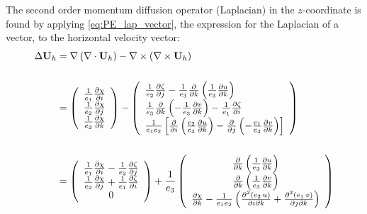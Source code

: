 \documentclass[../main/NEMO_manual]{subfiles}
\begin{document}
The second order momentum diffusion operator (Laplacian) in the $z$-coordinate is found by
applying \autoref{eq:PE_lap_vector}, the expression for the Laplacian of a vector,
to the horizontal velocity vector:
\begin{align*}
  \Delta {\textbf{U}}_h
  &=\nabla \left( {\nabla \cdot {\textbf{U}}_h } \right)-
    \nabla \times \left( {\nabla \times {\textbf{U}}_h } \right) \\ \\
  &=\left( {{
    \begin{array}{*{20}c}
      {\frac{1}{e_1 }\frac{\partial \chi }{\partial i}} \hfill \\
      {\frac{1}{e_2 }\frac{\partial \chi }{\partial j}} \hfill \\
      {\frac{1}{e_3 }\frac{\partial \chi }{\partial k}} \hfill \\
    \end{array}
  }} \right)
  -\left( {{
  \begin{array}{*{20}c}
    {\frac{1}{e_2 }\frac{\partial \zeta }{\partial j}-\frac{1}{e_3
    }\frac{\partial }{\partial k}\left( {\frac{1}{e_3 }\frac{\partial
    u}{\partial k}} \right)} \hfill \\
    {\frac{1}{e_3 }\frac{\partial }{\partial k}\left( {-\frac{1}{e_3
    }\frac{\partial v}{\partial k}} \right)-\frac{1}{e_1 }\frac{\partial \zeta
    }{\partial i}} \hfill \\
    {\frac{1}{e_1 e_2 }\left[ {\frac{\partial }{\partial i}\left( {\frac{e_2
    }{e_3 }\frac{\partial u}{\partial k}} \right)-\frac{\partial }{\partial
    j}\left( {-\frac{e_1 }{e_3 }\frac{\partial v}{\partial k}} \right)} \right]}
    \hfill \\
  \end{array}
  }} \right) \\ \\
  &=\left( {{
    \begin{array}{*{20}c}
      {\frac{1}{e_1 }\frac{\partial \chi }{\partial i}-\frac{1}{e_2 }\frac{\partial \zeta }{\partial j}} \\
      {\frac{1}{e_2 }\frac{\partial \chi }{\partial j}+\frac{1}{e_1 }\frac{\partial \zeta }{\partial i}} \\
      0 \\
    \end{array}
  }} \right)
  +\frac{1}{e_3 }
  \left( {{
  \begin{array}{*{20}c}
    {\frac{\partial }{\partial k}\left( {\frac{1}{e_3 }\frac{\partial u}{\partial k}} \right)} \\
    {\frac{\partial }{\partial k}\left( {\frac{1}{e_3 }\frac{\partial v}{\partial k}} \right)} \\
    {\frac{\partial \chi }{\partial k}-\frac{1}{e_1 e_2 }\left( {\frac{\partial ^2\left( {e_2 \,u} \right)}{\partial i\partial k}+\frac{\partial ^2\left( {e_1 \,v} \right)}{\partial j\partial k}} \right)} \\
  \end{array}
  }} \right)
\end{align*}
\end{document}
